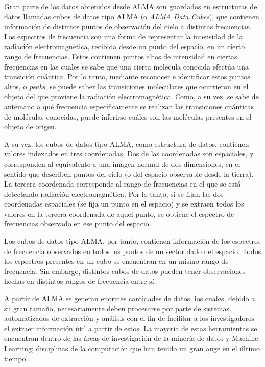 Gran parte de los datos obtenidos desde ALMA son guardados en estructuras de datos llamadas cubos de datos tipo ALMA (o \textit{ALMA Data Cubes}), que contienen información de distintos puntos de observación del cielo a distintas frecuencias. 
Los espectros de frecuencia son una forma de representar la intensidad de la radiación electromagnética, recibida desde un punto del espacio, en un cierto rango de frecuencias. Estos contienen puntos altos de intensidad en ciertas frecuencias en las cuales se sabe que una cierta molécula conocida efectúa una transición cuántica. Por lo tanto, mediante reconocer e identificar estos puntos altos, o \textit{peaks}, se puede saber las transiciones moleculares que ocurrieron en el objeto del que proviene la radiación electromagnética. Como, a su vez, se sabe de antemano a qué frecuencia específicamente se realizan las transiciones cuánticas de moléculas conocidas, puede inferirse cuáles son las moléculas presentes en el objeto de origen.

A su vez, los cubos de datos tipo ALMA, como estructura de datos, contienen valores indexados en tres coordenadas. Dos de las coordenadas son espaciales, y corresponden al equivalente a una imagen normal de dos dimensiones, en el sentido que describen puntos del cielo (o del espacio observable desde la tierra). La tercera coordenada corresponde al rango de frecuencias en el que se está detectando radiación electromagnética. Por lo tanto, si se fijan las dos coordenadas espaciales (se fija un punto en el espacio) y se extraen todos los valores en la tercera coordenada de aquel punto, se obtiene el espectro de frecuencias observado en ese punto del espacio.

Los cubos de datos tipo ALMA, por tanto, contienen información de los espectros de frecuencia observados en todos los puntos de un sector dado del espacio. Todos los espectros presentes en un cubo se encuentran en un mismo rango de frecuencia. Sin embargo, distintos cubos de datos pueden tener observaciones hechas en distintos rangos de frecuencia entre sí.

A partir de ALMA se generan enormes cantidades de datos, los cuales, debido a su gran tamaño,  necesariamente deben procesarse por parte de sistemas automatizados de extracción y análisis con el fin de facilitar a los investigadores el extraer información útil a partir de estos. La mayoría de estas herramientas se encuentran dentro de las áreas de investigación de la minería de datos y Machine Learning; disciplinas de la computación que han tenido un gran auge en el último tiempo.

